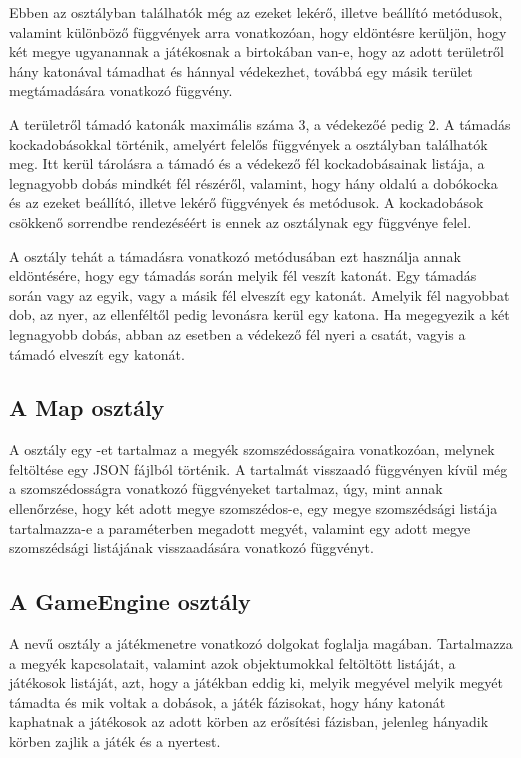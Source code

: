Ebben az osztályban találhatók még az ezeket lekérő, illetve beállító metódusok, valamint különböző függvények arra vonatkozóan, hogy eldöntésre kerüljön, hogy két megye ugyanannak a játékosnak a birtokában van-e, hogy az adott területről hány katonával támadhat és hánnyal védekezhet, továbbá egy másik terület megtámadására vonatkozó függvény. 

A területről támadó katonák maximális száma 3, a védekezőé pedig 2.
A támadás kockadobásokkal történik, amelyért felelős függvények a  osztályban találhatók meg.
Itt kerül tárolásra a támadó és a védekező fél kockadobásainak listája, a legnagyobb dobás mindkét fél részéről, valamint, hogy hány oldalú a dobókocka és az ezeket beállító, illetve lekérő függvények és metódusok.
A kockadobások csökkenő sorrendbe rendezéséért is ennek az osztálynak egy függvénye felel. 

A  osztály tehát a támadásra vonatkozó metódusában ezt használja annak eldöntésére, hogy egy támadás során melyik fél veszít katonát.
Egy támadás során vagy az egyik, vagy a másik fél elveszít egy katonát.
Amelyik fél nagyobbat dob, az nyer, az ellenféltől pedig levonásra kerül egy katona.
Ha megegyezik a két legnagyobb dobás, abban az esetben a védekező fél nyeri a csatát, vagyis a támadó elveszít egy katonát.

\subsection*{A Map osztály}

A  osztály egy -et tartalmaz a megyék szomszédosságaira vonatkozóan, melynek feltöltése egy JSON fájlból történik.
A  tartalmát visszaadó függvényen kívül még a szomszédosságra vonatkozó függvényeket tartalmaz, úgy, mint annak ellenőrzése, hogy két adott megye szomszédos-e, egy megye szomszédsági listája tartalmazza-e a paraméterben megadott megyét, valamint egy adott megye szomszédsági listájának visszaadására vonatkozó függvényt. 

\subsection*{A GameEngine osztály}

A  nevű osztály a játékmenetre vonatkozó dolgokat foglalja magában.
Tartalmazza a megyék kapcsolatait, valamint azok  objektumokkal feltöltött listáját, a játékosok listáját, azt, hogy a játékban eddig ki, melyik megyével melyik megyét támadta és mik voltak a dobások, a játék fázisokat, hogy hány katonát kaphatnak a játékosok az adott körben az erősítési fázisban, jelenleg hányadik körben zajlik a játék és a nyertest. 

